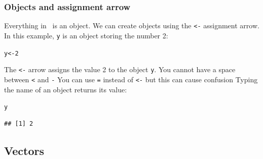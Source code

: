 \documentclass[color=usenames,dvipsnames]{beamer}\usepackage[]{graphicx}\usepackage[]{color}
\makeatletter
\newcommand{\hlnum}[1]{\textcolor[rgb]{0.69,0.494,0}{#1}}%
\newcommand{\hlstd}[1]{\textcolor[rgb]{0,0,0}{#1}}%
\newcommand{\hlkwb}[1]{\textcolor[rgb]{0,0.341,0.682}{#1}}%
\newenvironment{kframe}{%
 \def\at@end@of@kframe{}%
 \ifinner\ifhmode%
  \def\at@end@of@kframe{\end{minipage}}%
  \begin{minipage}{\columnwidth}%
 \fi\fi%
 \def\FrameCommand##1{\hskip\@totalleftmargin \hskip-\fboxsep
 \colorbox{shadecolor}{##1}\hskip-\fboxsep
     \hskip-\linewidth \hskip-\@totalleftmargin \hskip\columnwidth}%
 \MakeFramed {\advance\hsize-\width
   \@totalleftmargin\z@ \linewidth\hsize
   \@setminipage}}%
 {\par\unskip\endMakeFramed%
 \at@end@of@kframe}
\newenvironment{knitrout}{}{} %
\newcommand{\inr}[1]{\colorbox{inlinecolor}{\texttt{#1}}}
\makeatother
\begin{document}





\begin{frame}[fragile]
  \frametitle{Objects and assignment arrow}
      Everything in \R~is an object. We can create objects using the
      \inr{<-} assignment arrow.
      \pause \vfill
      In this example, \inr{y} is an object storing the number 2:
\begin{knitrout}
\color{fgcolor}\begin{kframe}
\begin{alltt}
\hlstd{y} \hlkwb{<-} \hlnum{2}
\end{alltt}
\end{kframe}
\end{knitrout}
\pause \vfill
The \inr{<-} arrow assigns the value 2 to the object \inr{y}.
      \pause \vfill
      You cannot have a space between \inr{<} and \inr{-}
      \pause \vfill
      You can use \inr{=} instead of \inr{<-} but this can cause confusion
      \pause \vfill
      Typing the name of an object returns its value:
\begin{knitrout}
\color{fgcolor}\begin{kframe}
\begin{alltt}
\hlstd{y}
\end{alltt}
\begin{verbatim}
## [1] 2
\end{verbatim}
\end{kframe}
\end{knitrout}
\end{frame}


\subsection{Vectors}
\end{document}
